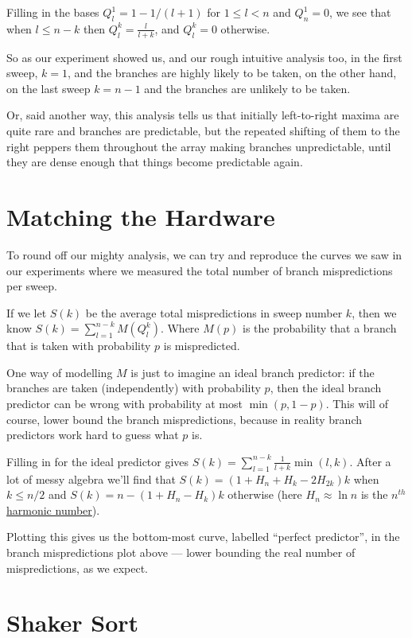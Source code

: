 \documentclass[11pt]{article}
\begin{document}
Filling in the bases $Q^1_l = 1 - 1/(l + 1)$ for $1 \leq l < n$ and $Q^1_n = 0$, we see that when $l \leq n - k$ then $Q^k_l = \frac{l}{l + k}$, and $Q^k_l = 0$ otherwise.

So as our experiment showed us, and our rough intuitive analysis too, in the first sweep, $k = 1$, and the branches are highly likely to be taken, on the other hand, on the last sweep $k = n - 1$ and the branches are unlikely to be taken.

Or, said another way, this analysis tells us that initially left-to-right maxima are quite rare and branches are predictable, but the repeated shifting of them to the right peppers them throughout the array making branches unpredictable, until they are dense enough that things become predictable again.

\section{Matching the Hardware}

To round off our mighty analysis, we can try and reproduce the curves we saw in our experiments where we measured the total number of branch mispredictions per sweep.

If we let $S(k)$ be the average total mispredictions in sweep number $k$, then we know
$S(k) = \sum_{l=1}^{n-k}M(Q^k_l)$. Where $M(p)$ is the probability that a branch that is taken with probability $p$ is mispredicted.

One way of modelling $M$ is just to imagine an ideal branch predictor: if the branches are taken (independently) with probability $p$, then the ideal branch predictor can be wrong with probability at most $\min(p, 1 - p)$. This will of course, lower bound the branch mispredictions, because in reality branch predictors work hard to guess what $p$ is.

Filling in for the ideal predictor gives $S(k) = \sum_{l=1}^{n-k}\frac{1}{l + k}\min(l, k)$. After a lot of messy algebra we'll find that $S(k) = (1 + H_n + H_k - 2H_{2k})k$ when $k \leq n/2$ and $S(k) = n - (1 + H_n - H_k)k$ otherwise (here $H_n \approx \ln n$ is the $n^{th}$ \href{http://en.wikipedia.org/wiki/Harmonic_number}{harmonic number}).

Plotting this gives us the bottom-most curve, labelled ``perfect predictor'', in the branch mispredictions plot above --- lower bounding the real number of mispredictions, as we expect.

\section{Shaker Sort}
\end{document}
